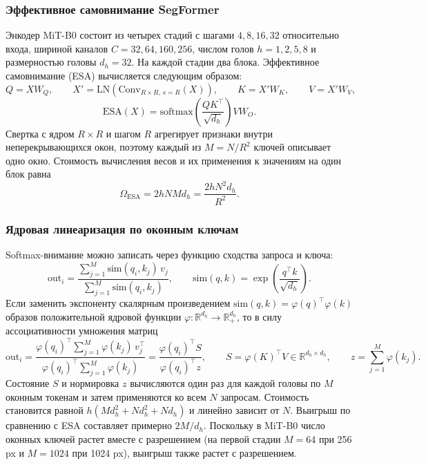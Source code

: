 \documentclass[a4paper,14pt]{article}
\numberwithin{figure}{section}
\numberwithin{table}{section}
\begin{document}
\subsubsection{Эффективное самовнимание SegFormer}

	Энкодер MiT-B0 состоит из четырех стадий с шагами $4, 8, 16, 32$ относительно входа, шириной каналов $C = 32, 64, 160, 256$, числом голов
	$h = 1, 2, 5, 8$ и размерностью головы $d_h = 32$. На каждой стадии два блока. Эффективное самовнимание (ESA) вычисляется следующим образом:
	$$
	Q = X W_Q, \qquad X' = \mathrm{LN}\left(\mathrm{Conv}_{R \times R,\, s = R}(X)\right), \qquad K = X' W_K, \qquad V = X' W_V,
	$$
	$$
	\mathrm{ESA}(X) = \mathrm{softmax}\left(\frac{Q K^{\top}}{\sqrt{d_h}}\right) V W_O.
	$$
	Свертка с ядром $R \times R$ и шагом $R$ агрегирует признаки внутри неперекрывающихся окон, поэтому каждый из $M = N / R^2$ ключей описывает одно окно.
	Стоимость вычисления весов и их применения к значениям на один блок равна
	$$
	\Omega_{\mathrm{ESA}} = 2 h N M d_h = \frac{2 h N^2 d_h}{R^2}.
	$$

\subsubsection{Ядровая линеаризация по оконным ключам}

	Softmax-внимание можно записать через функцию сходства запроса и ключа:
	$$
	\mathrm{out}_i = \frac{\sum_{j=1}^{M} \mathrm{sim}(q_i, k_j)\, v_j}{\sum_{j=1}^{M} \mathrm{sim}(q_i, k_j)}, \qquad \mathrm{sim}(q, k) = \exp\left(\frac{q^{\top} k}{\sqrt{d_h}}\right).
	$$
	Если заменить экспоненту скалярным произведением $\mathrm{sim}(q, k) = \varphi(q)^{\top} \varphi(k)$ образов положительной ядровой
	функции $\varphi: \mathbb{R}^{d_h} \to \mathbb{R}^{d_h}_{+}$, то в силу ассоциативности умножения матриц
	$$
	\mathrm{out}_i = \frac{\varphi(q_i)^{\top} \sum_{j=1}^{M} \varphi(k_j)\, v_j^{\top}}{\varphi(q_i)^{\top} \sum_{j=1}^{M} \varphi(k_j)}
	= \frac{\varphi(q_i)^{\top} S}{\varphi(q_i)^{\top} z}, \qquad S = \varphi(K)^{\top} V \in \mathbb{R}^{d_h \times d_h}, \qquad z = \sum_{j=1}^{M} \varphi(k_j).
	$$
	Состояние $S$ и нормировка $z$ вычисляются один раз для каждой головы по $M$ оконным токенам и затем применяются ко всем $N$ запросам. Стоимость
	становится равной $h(M d_h^2 + N d_h^2 + N d_h)$ и линейно зависит от $N$. Выигрыш по сравнению с ESA составляет примерно $2M / d_h$. Поскольку в MiT-B0
	число оконных ключей растет вместе с разрешением (на первой стадии $M = 64$ при 256 px и $M = 1024$ при 1024 px), выигрыш также растет с разрешением.
\end{document}
